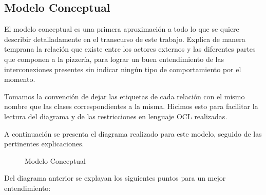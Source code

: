 \documentclass[a4paper,10pt]{article}
\begin{document}
\bigskip

\subsection*{Modelo Conceptual}

El modelo conceptual es una primera aproximaci\'on a todo lo que se quiere describir detalladamente en el transcurso de este trabajo. Explica 
de manera temprana la relaci\'on que existe entre los actores externos y las diferentes partes que componen a la pizzer\'ia, para lograr un buen
entendimiento de las interconexiones presentes sin indicar ning\'un tipo de comportamiento por el momento. 

Tomamos la convención de dejar
las etiquetas de cada relación con el mismo nombre que las clases correspondientes a la misma. Hicimos esto para facilitar la lectura del diagrama
y de las restricciones en lenguaje OCL realizadas.

A continuaci\'on se presenta el diagrama realizado para este modelo, seguido de las pertinentes explicaciones.

\begin{figure}[H]
\centering
{}
\caption{Modelo Conceptual}
\end{figure}

\medskip

Del diagrama anterior se explayan los siguientes puntos para un mejor entendimiento:
\end{document}
